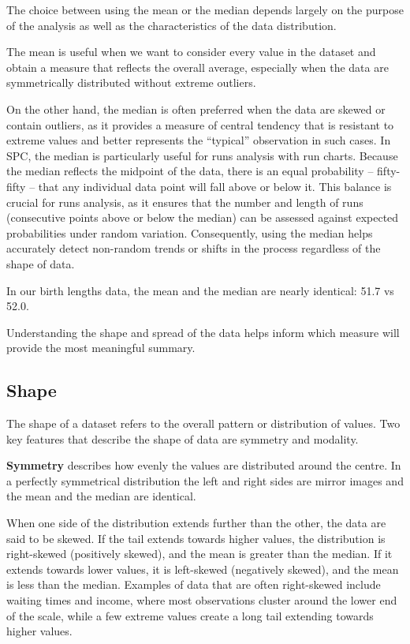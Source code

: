 \documentclass[
]{book}
\begin{document}
The choice between using the mean or the median depends largely on the purpose of the analysis as well as the characteristics of the data distribution.

The mean is useful when we want to consider every value in the dataset and obtain a measure that reflects the overall average, especially when the data are symmetrically distributed without extreme outliers.

On the other hand, the median is often preferred when the data are skewed or contain outliers, as it provides a measure of central tendency that is resistant to extreme values and better represents the ``typical'' observation in such cases.
In SPC, the median is particularly useful for runs analysis with run charts. Because the median reflects the midpoint of the data, there is an equal probability -- fifty-fifty -- that any individual data point will fall above or below it. This balance is crucial for runs analysis, as it ensures that the number and length of runs (consecutive points above or below the median) can be assessed against expected probabilities under random variation. Consequently, using the median helps accurately detect non-random trends or shifts in the process regardless of the shape of data.

In our birth lengths data, the mean and the median are nearly identical: 51.7 vs 52.0.

Understanding the shape and spread of the data helps inform which measure will provide the most meaningful summary.

\subsection{Shape}\label{shape}

The shape of a dataset refers to the overall pattern or distribution of values. Two key features that describe the shape of data are symmetry and modality.

\textbf{Symmetry} describes how evenly the values are distributed around the centre. In a perfectly symmetrical distribution the left and right sides are mirror images and the mean and the median are identical.

When one side of the distribution extends further than the other, the data are said to be skewed. If the tail extends towards higher values, the distribution is right-skewed (positively skewed), and the mean is greater than the median. If it extends towards lower values, it is left-skewed (negatively skewed), and the mean is less than the median. Examples of data that are often right-skewed include waiting times and income, where most observations cluster around the lower end of the scale, while a few extreme values create a long tail extending towards higher values.
\end{document}
